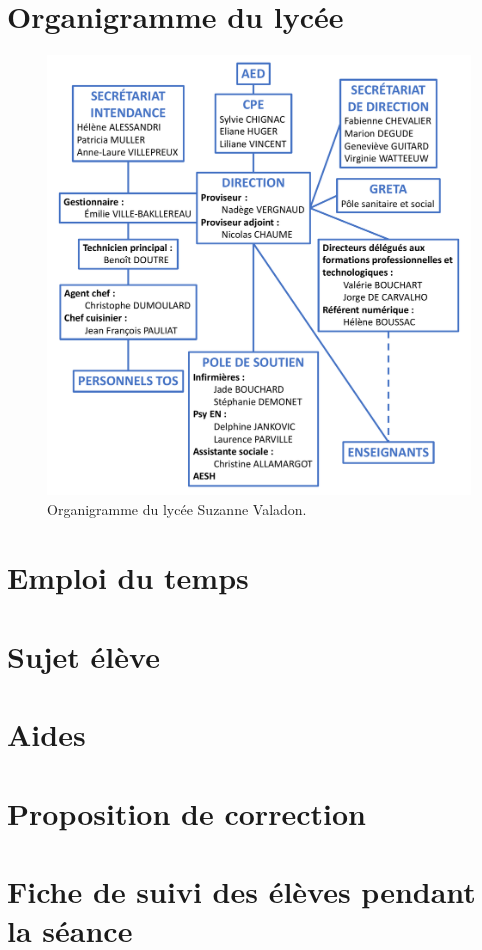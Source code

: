 \documentclass[12pt,a4paper]{article}
\begin{document}
\newpage
\section{Organigramme du lycée}
\label{ann:organigramme}

\begin{figure}[h]
\center
\includegraphics[width=\textwidth]{organigramme.pdf}
\caption{Organigramme du lycée Suzanne Valadon.}
\label{fig:organigramme}
\end{figure}

\newpage

\section{Emploi du temps}
\label{ann:edt}



\section{Sujet élève}
\label{ann:sujet}



\section{Aides}
\label{ann:aides}



\section{Proposition de correction}
\label{ann:corr}



\section{Fiche de suivi des élèves pendant la séance}
\label{ann:suivi}


\end{document}
